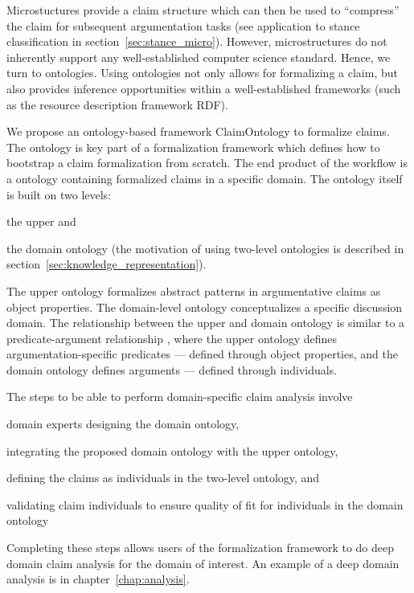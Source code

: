 Microstuctures provide a claim structure which can then be used 
to ``compress'' the claim for subsequent argumentation tasks
(see application to stance classification in section~\ref{sec:stance_micro}).
However, microstructures do not inherently support any
well-established computer science standard. 
Hence, we turn to ontologies. Using ontologies not only allows for 
formalizing a claim, but also provides inference opportunities within
a well-established frameworks (such as the resource description framework RDF). 

We propose an ontology-based framework ClaimOntology to  formalize claims. The
ontology is key part of a formalization framework which defines how to
bootstrap a claim formalization from scratch. The end product of the workflow
is a ontology containing formalized claims in a specific domain. 
The ontology itself is built on two levels: 
\begin{enumerate*}[label=(\arabic*)]
\item the upper and 
\item the domain ontology 
(the motivation of using two-level ontologies is described in
		section~\ref{sec:knowledge_representation}). 
\end{enumerate*}
The upper ontology formalizes abstract patterns in argumentative
claims as object properties. The domain-level ontology conceptualizes 
a specific discussion domain. The relationship between the upper 
and domain ontology is similar to a predicate-argument
relationship \citep{hindle1990noun}, where the upper ontology
defines argumentation-specific predicates --- defined through object properties, 
and the domain ontology defines arguments --- defined through 
individuals. 

The steps to be able to perform domain-specific claim analysis
involve
\begin{enumerate*}[label=(\arabic*)]
\item domain experts designing the domain ontology,
\item integrating the proposed domain ontology with the upper ontology,
\item defining the claims as individuals in the two-level ontology, and
\item validating claim individuals to ensure quality of fit for
	individuals in the domain ontology
\end{enumerate*}
Completing these steps allows users of the formalization framework
to do deep domain claim analysis for the domain of interest. 
An example of a deep domain analysis is in chapter~\ref{chap:analysis}.

